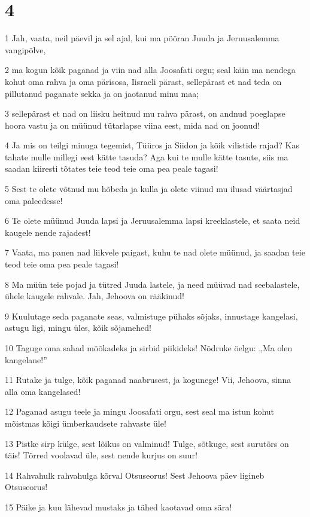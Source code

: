 \chapter{4}

\par 1 Jah, vaata, neil päevil ja sel ajal, kui ma pööran Juuda ja Jeruusalemma vangipõlve,
\par 2 ma kogun kõik paganad ja viin nad alla Joosafati orgu; seal käin ma nendega kohut oma rahva ja oma pärisosa, Iisraeli pärast, sellepärast et nad teda on pillutanud paganate sekka ja on jaotanud minu maa;
\par 3 sellepärast et nad on liisku heitnud mu rahva pärast, on andnud poeglapse hoora vastu ja on müünud tütarlapse viina eest, mida nad on joonud!
\par 4 Ja mis on teilgi minuga tegemist, Tüüros ja Siidon ja kõik vilistide rajad? Kas tahate mulle millegi eest kätte tasuda? Aga kui te mulle kätte tasute, siis ma saadan kiiresti tõtates teie teod teie oma pea peale tagasi!
\par 5 Sest te olete võtnud mu hõbeda ja kulla ja olete viinud mu ilusad väärtasjad oma paleedesse!
\par 6 Te olete müünud Juuda lapsi ja Jeruusalemma lapsi kreeklastele, et saata neid kaugele nende rajadest!
\par 7 Vaata, ma panen nad liikvele paigast, kuhu te nad olete müünud, ja saadan teie teod teie oma pea peale tagasi!
\par 8 Ma müün teie pojad ja tütred Juuda lastele, ja need müüvad nad seebalastele, ühele kaugele rahvale. Jah, Jehoova on rääkinud!
\par 9 Kuulutage seda paganate seas, valmistuge pühaks sõjaks, innustage kangelasi, astugu ligi, mingu üles, kõik sõjamehed!
\par 10 Taguge oma sahad mõõkadeks ja sirbid piikideks! Nõdruke öelgu: „Ma olen kangelane!”
\par 11 Rutake ja tulge, kõik paganad naabrusest, ja kogunege! Vii, Jehoova, sinna alla oma kangelased!
\par 12 Paganad asugu teele ja mingu Joosafati orgu, sest seal ma istun kohut mõistmas kõigi ümberkaudsete rahvaste üle!
\par 13 Pistke sirp külge, sest lõikus on valminud! Tulge, sõtkuge, sest surutõrs on täis! Tõrred voolavad üle, sest nende kurjus on suur!
\par 14 Rahvahulk rahvahulga kõrval Otsuseorus! Sest Jehoova päev ligineb Otsuseorus!
\par 15 Päike ja kuu lähevad mustaks ja tähed kaotavad oma sära!
